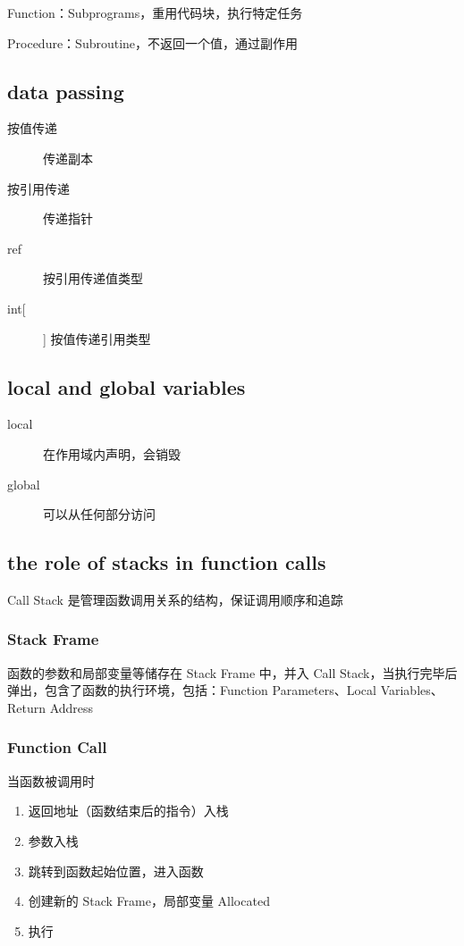 \documentclass[11pt,journal,compsoc]{IEEEtran}
\begin{document}
Function：Subprograms，重用代码块，执行特定任务

Procedure：Subroutine，不返回一个值，通过副作用


\subsection{data passing}

\begin{description}
    \item[按值传递] 传递副本
    \item[按引用传递] 传递指针
    \item[ref] 按引用传递值类型 
    \item[int[]] 按值传递引用类型 
\end{description}


\subsection{local and global variables}

\begin{description}
    \item[local] 在作用域内声明，会销毁

    \item[global] 可以从任何部分访问
\end{description}


\subsection{the role of stacks in function calls}

Call Stack 是管理函数调用关系的结构，保证调用顺序和追踪


\subsubsection{Stack Frame}

函数的参数和局部变量等储存在 Stack Frame 中，并入 Call Stack，当执行完毕后弹出，包含了函数的执行环境，包括：Function Parameters、Local Variables、Return Address


\subsubsection{Function Call}

当函数被调用时

\begin{enumerate}
    \item 返回地址（函数结束后的指令）入栈
    \item 参数入栈
    \item 跳转到函数起始位置，进入函数
    \item 创建新的 Stack Frame，局部变量 Allocated
    \item 执行
\end{enumerate}
\end{document}
